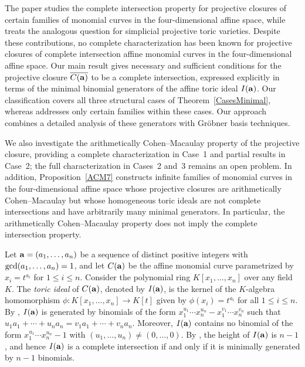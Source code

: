 \documentclass[10pt]{amsart}
\begin{document}
The paper \cite{BG2} studies the complete intersection property for projective closures of certain families of monomial curves in the four-dimensional affine space, while \cite{BG} treats the analogous question for simplicial projective toric varieties. Despite these contributions, no complete characterization has been known for projective closures of complete intersection affine monomial curves in the four-dimensional affine space. Our main result gives necessary and sufficient
conditions for the projective closure $\overline{C({\bf a})}$ to be a
complete intersection, expressed explicitly in terms of the minimal binomial generators
of the affine toric ideal $I({\bf a})$. Our classification covers all three structural cases of Theorem~\ref{CasesMinimal}, whereas \cite{BG2} addresses only certain
families within these cases. Our approach combines a detailed analysis of
these generators with Gr\"obner basis techniques.

We also investigate the arithmetically Cohen--Macaulay property of the projective closure, providing a complete characterization in Case~1 and partial results in Case~2; the full characterization in Cases~2 and~3 remains
an open problem. In addition, Proposition~\ref{ACM7} constructs infinite families of monomial 
curves in the four-dimensional affine space whose projective closures are arithmetically 
Cohen--Macaulay but whose homogeneous toric ideals are not complete 
intersections and have arbitrarily many minimal generators. In particular, 
the arithmetically Cohen--Macaulay property does not imply the complete 
intersection property.


Let ${\bf a}=(a_{1},\ldots,a_{n})$ be a sequence of distinct positive integers with ${\rm gcd}(a_{1},\ldots,a_{n})=1$, and let $C({\bf a})$ be the affine monomial curve parametrized by $x_{i}=t^{a_i}$ for $1 \leq i \leq n$. Consider the polynomial ring $K[x_{1},\ldots,x_{n}]$ over any field $K$. The {\em toric ideal} of $C({\bf a})$, denoted by $I({\bf a})$, is the kernel of the $K$-algebra homomorphism $\phi \colon K[x_{1},\ldots,x_{n}] \to K[t]$ given by $\phi(x_{i})=t^{a_i}$ for all $1 \leq i \leq n$. By \cite[Lemma 4.1]{Sturmfels95}, $I({\bf a})$ is generated by binomials of the form $x_{1}^{u_1} \cdots x_{n}^{u_n}-x_{1}^{v_1} \cdots x_{n}^{v_n}$ such that $u_{1}a_{1}+\cdots+u_{n}a_{n}=v_{1}a_{1}+\cdots+v_{n}a_{n}$. Moreover, $I({\bf a})$ contains no binomial of the form $x_{1}^{u_1} \cdots x_{n}^{u_n}-1$ with $(u_1,\ldots,u_n) \neq (0,\ldots,0)$. By \cite[Lemma 4.2]{Sturmfels95}, the height of $I({\bf a})$ is $n-1$, and hence
$I({\bf a})$ is a complete intersection if and only if it is minimally generated by $n-1$ binomials.
\end{document}
